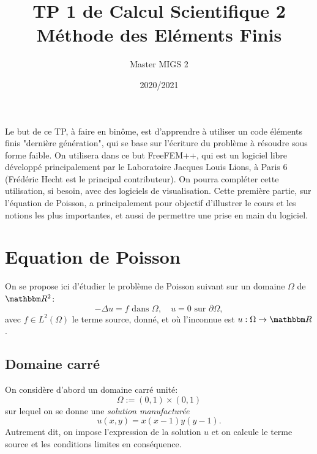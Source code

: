 


\newcommand{\eps}{\varepsilon}

\usepackage{url}

\title{TP 1 de Calcul Scientifique 2\\ Méthode des Eléments Finis}

\author{Master MIGS 2}

\date{2020/2021}



\maketitle

Le but de ce TP, à faire en binôme, est d'apprendre à utiliser un code éléments finis "dernière génération", qui se base sur l'écriture du problème à résoudre sous forme faible.
%
On utilisera dans ce but FreeFEM++, qui est un logiciel libre développé principalement par le Laboratoire Jacques Louis Lions, à Paris 6 (Frédéric Hecht est le principal contributeur).
On pourra compléter cette utilisation, si besoin, avec des logiciels de visualisation.
%
Cette première partie, sur l'équation de Poisson, a principalement pour objectif d'illustrer le cours et les notions les plus importantes, et aussi de permettre une prise en main du logiciel. %

\parindent0mm

\section{Equation de Poisson}

On se propose ici d'étudier le problème de Poisson suivant sur un domaine $\Omega$ de $\eR^2$:
\[
-\Delta u = f \textrm{ dans } \Omega,
\quad
u = 0 \textrm{ sur } \partial \Omega,
\]
avec $f \in L^2(\Omega)$ le terme source, donné, et où l'inconnue est $u : \Omega \rightarrow \eR$.

\subsection{Domaine carré}

On considère d'abord un domaine carré unité:
\[
\Omega := (0,1) \times (0,1)
\]
sur lequel on se donne une \emph{solution manufacturée}
$$ u(x,y) = x(x-1)y(y-1).$$
Autrement dit, on impose l'expression de la solution $u$ et on calcule le terme source et les conditions limites en conséquence.


